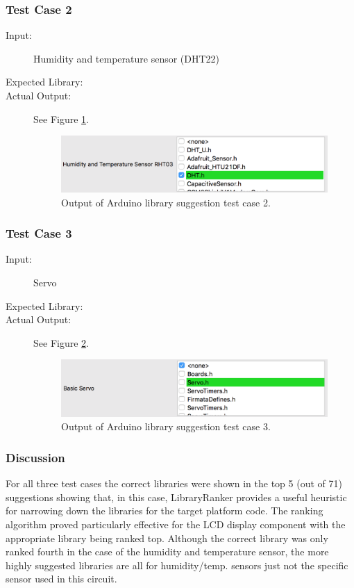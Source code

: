 \documentclass{UoYCSproject}
\begin{document}
\subsubsection{Test Case 2} \label{arduino_tc2}
\begin{description}
\item[Input:] Humidity and temperature sensor (DHT22)
\item[Expected Library:] 
\item[Actual Output:] See Figure \ref{fig:lib_suggest_humidity}.
\begin{figure}[h!]
  \centering
  \includegraphics[width=0.5\linewidth]{graphics/lib_suggest_humidity.png}
  \caption{Output of Arduino library suggestion test case 2.}
  \label{fig:lib_suggest_humidity}
\end{figure}
\end{description}

\subsubsection{Test Case 3} \label{arduino_tc3}
\begin{description}
\item[Input:] Servo
\item[Expected Library:] 
\item[Actual Output:] See Figure \ref{fig:lib_suggest_servo}.
\begin{figure}[h!]
  \centering
  \includegraphics[width=0.5\linewidth]{graphics/lib_suggest_servo.png}
  \caption{Output of Arduino library suggestion test case 3.}
  \label{fig:lib_suggest_servo}
\end{figure}
\end{description}

\subsubsection{Discussion} \label{arduino_lib_discussion}
For all three test cases the correct libraries were shown in the top 5 (out of 71) suggestions showing that, in this case, LibraryRanker provides a useful heuristic for narrowing down the libraries for the target platform code. The ranking algorithm proved particularly effective for the LCD display component with the appropriate  library being ranked top. Although the correct library was only ranked fourth in the case of the humidity and temperature sensor, the more highly suggested libraries are all for humidity/temp. sensors just not the specific  sensor used in this circuit.
\end{document}
